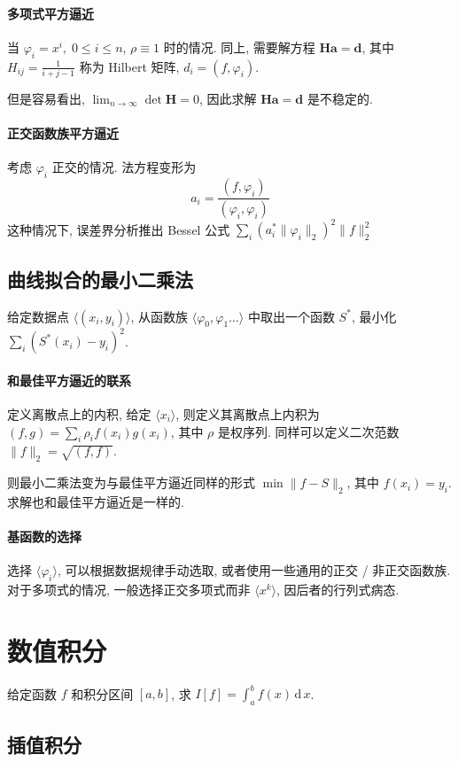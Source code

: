 \documentclass{ctexart}
\newcommand{\ud}{\,\mathrm{d}\,}
\begin{document}
\paragraph{多项式平方逼近}
    当 $\varphi_i = x^i,\;0 \le i \le n$, $\rho \equiv 1$ 时的情况.
    同上, 需要解方程 $\mathbf{H} \mathbf{a} = \mathbf{d}$,
    其中 $H_{ij} = \frac{1}{i+j-1}$ 称为 Hilbert 矩阵,
    $d_i = (f, \varphi_i)$.\par
    但是容易看出, $\lim_{n\to\infty} \det \mathbf{H} = 0$, 因此求解
    $\mathbf{H} \mathbf{a} = \mathbf{d}$ 是不稳定的.
\paragraph{正交函数族平方逼近}
    考虑 $\varphi_i$ 正交的情况. 法方程变形为 \[
        a_i = \frac{(f, \varphi_i)}{(\varphi_i, \varphi_i)}\]
    这种情况下, 误差界分析推出 Bessel 公式 $ \sum_i \left(a^*_i \|\varphi_i\|_2\right)^2 \|f\|_2^2 $

\subsection{曲线拟合的最小二乘法}
    给定数据点 $\langle (x_i, y_i) \rangle$,
    从函数族 $\langle \varphi_0, \varphi_1 \ldots \rangle$
    中取出一个函数 $S^*$, 最小化 $\sum_i (S^*(x_i) - y_i)^2$.
\paragraph{和最佳平方逼近的联系}
    定义离散点上的内积, 给定 $\langle x_i \rangle$, 则定义其离散点上内积为
    $(f, g) = \sum_i \rho_i f(x_i) g(x_i)$, 其中 $\rho$ 是权序列.
    同样可以定义二次范数 $\|f\|_2 = \sqrt{(f, f)}$.\par
    则最小二乘法变为与最佳平方逼近同样的形式
    $\min \|f - S\|_2$, 其中 $f(x_i) = y_i$.
    求解也和最佳平方逼近是一样的.
\paragraph{基函数的选择}
    选择 $\langle \varphi_i \rangle$,
    可以根据数据规律手动选取,
    或者使用一些通用的正交 / 非正交函数族.
    对于多项式的情况, 一般选择正交多项式而非 $\langle x^k \rangle$,
    因后者的行列式病态.

\section{数值积分}
    给定函数 $f$ 和积分区间 $[a,b]$, 求 $I[f] = \int_a^b f(x) \ud x$.
\subsection{插值积分}
\end{document}
